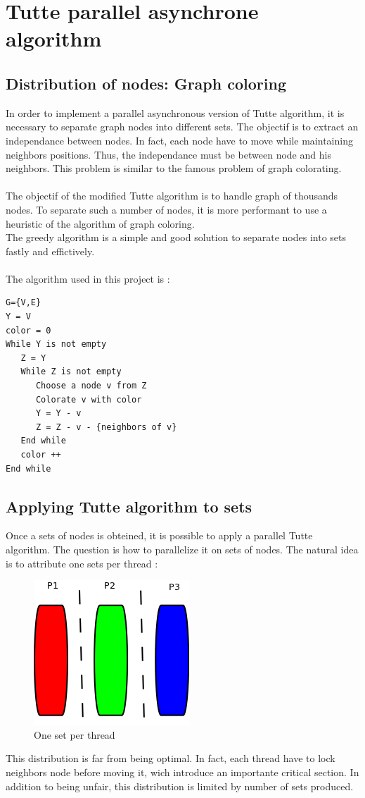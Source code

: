 \section{Tutte parallel asynchrone algorithm}
\subsection{Distribution of nodes: Graph coloring}
In order to implement a parallel asynchronous version of Tutte algorithm, it is necessary to separate graph nodes into different sets. The objectif is to extract an independance between nodes. In fact, each node have to move while maintaining neighbors positions. Thus, the independance must be between node and his neighbors. This problem is similar to the famous problem of graph colorating.
\paragraph*{}
The objectif of the modified Tutte algorithm is to handle graph of thousands nodes. To separate such a number of nodes, it is more performant to use a heuristic of the algorithm of graph coloring.\\
The greedy algorithm is a simple and good solution to separate nodes into sets fastly and effictively.
\paragraph*{}
The algorithm used in this project is :
\begin{verbatim}
G={V,E}
Y = V
color = 0
While Y is not empty
   Z = Y
   While Z is not empty
      Choose a node v from Z
      Colorate v with color
      Y = Y - v
      Z = Z - v - {neighbors of v}
   End while
   color ++
End while
\end{verbatim}
\subsection{Applying Tutte algorithm to sets}
Once a sets of nodes is obteined, it is possible to apply a parallel Tutte algorithm. The question is how to parallelize it on sets of nodes. The natural idea is to attribute one sets per thread :
\begin{figure}[!h]
\centering
\includegraphics[scale=0.5]{img/distribution_verticale.png}
\caption{One set per thread}
\end{figure}
This distribution is far from being optimal. In fact, each thread have to lock neighbors node before moving it, wich introduce an importante critical section. In addition to being unfair, this distribution is limited by number of sets produced.\\

